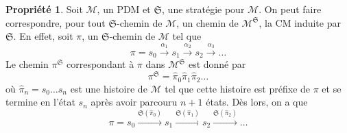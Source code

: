 \documentclass[12pt,a4paper]{report}
\theoremstyle{definition}%
\newtheorem{propriete}{Propriété}[chapter]
\theoremstyle{remark}
\begin{document}
\begin{propriete}
	Soit $\mathcal{M}$, un PDM et $\mathfrak{S}$, une stratégie pour $\mathcal{M}$.
	On peut faire correspondre, pour tout $\mathfrak{S}$-chemin de $\mathcal{M}$,
	un chemin de $\mathcal{M}^\mathfrak{S}$, la CM induite par $\mathfrak{S}$.
	En effet, soit $\pi$, un $\mathfrak{S}$-chemin de $\mathcal{M}$ tel que
	\[
		\pi = s_0 \xrightarrow{\alpha_1} s_1 \xrightarrow{\alpha_2} s_2 \xrightarrow{\alpha_3} \dots
\]
Le chemin $\pi^\mathfrak{S}$ correspondant à $\pi$ dans $\mathcal{M}^\mathfrak{S}$
est donné par
\[
	\pi^\mathfrak{S} = \hat{\pi}_0\hat{\pi}_1\hat{\pi}_2\dots
\]
où $\hat{\pi}_n = s_0 \dots s_n$ est une histoire de $\mathcal{M}$ tel que cette
histoire est préfixe de $\pi$ et se termine en l'état $s_n$ après avoir parcouru
$n+1$ états.
Dès lors, on a que
\[
	\pi = s_0 \xrightarrow{\mathfrak{S}(\hat{\pi}_0)} s_1 \xrightarrow{\mathfrak{S}(\hat{\pi}_1)} s_2 \xrightarrow{\mathfrak{S}(\hat{\pi}_2)} \dots
\]
\end{propriete}
\end{document}
